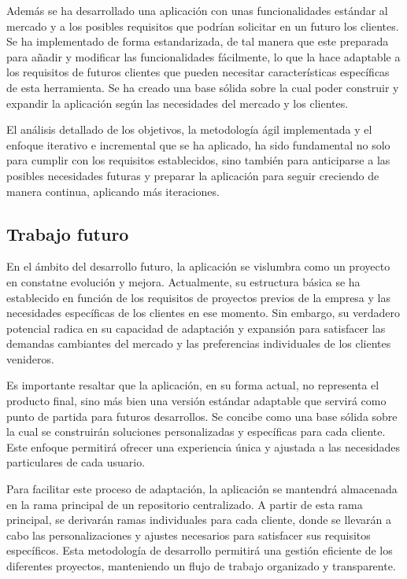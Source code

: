 \documentclass[11pt]{article}
\begin{document}
Además se ha desarrollado una aplicación con unas funcionalidades estándar al mercado y a los posibles requisitos que podrían solicitar en un futuro
los clientes. Se ha implementado de forma estandarizada, de tal manera que este preparada para añadir y modificar las funcionalidades fácilmente, lo que la hace
adaptable a los requisitos de futuros clientes que pueden necesitar características específicas de esta herramienta.
Se ha creado una base sólida sobre la cual poder construir y expandir la aplicación según las necesidades del mercado y los clientes.

El análisis detallado de los objetivos, la metodología ágil implementada y el enfoque iterativo e incremental que se ha aplicado,
ha sido fundamental no solo para cumplir con los requisitos establecidos, sino también para anticiparse a las posibles necesidades futuras y
preparar la aplicación para seguir creciendo de manera continua, aplicando más iteraciones.

\subsection{Trabajo futuro}
En el ámbito del desarrollo futuro, la aplicación se vislumbra como un proyecto en constatne evolución y mejora. Actualmente, su estructura básica se ha 
establecido en función de los requisitos de proyectos previos de la empresa y las necesidades específicas de los clientes en ese momento. Sin embargo, su 
verdadero potencial radica en su capacidad de adaptación y expansión para satisfacer las demandas cambiantes del mercado y las preferencias individuales de los 
clientes venideros.

Es importante resaltar que la aplicación, en su forma actual, no representa el producto final, sino más bien una versión estándar adaptable que servirá como punto
de partida para futuros desarrollos. Se concibe como una base sólida sobre la cual se construirán soluciones personalizadas y específicas para cada cliente. Este enfoque
permitirá ofrecer una experiencia única y ajustada a las necesidades particulares de cada usuario.

Para facilitar este proceso de adaptación, la aplicación se mantendrá almacenada en la rama principal de un repositorio centralizado. A partir de esta rama principal,
se derivarán ramas individuales para cada cliente, donde se llevarán a cabo las personalizaciones y ajustes necesarios para satisfacer sus requisitos específicos.
Esta metodología de desarrollo permitirá una gestión eficiente de los diferentes proyectos, manteniendo un flujo de trabajo organizado y transparente.
\end{document}
